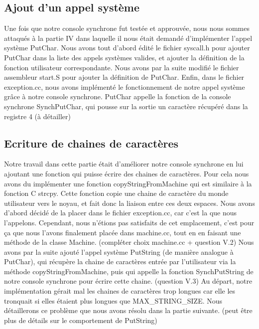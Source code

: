 \documentclass[12pt]{article}
\begin{document}
\subsection{Ajout d'un appel système}
Une fois que notre console synchrone fut testée et approuvée, nous nous sommes attaqués à la partie IV dans laquelle il nous était demandé d'implémenter l'appel système \textcolor{blue2}{PutChar}.
Nous avons tout d'abord édité le fichier \textcolor{vert2}{syscall.h} pour ajouter \textcolor{blue2}{PutChar} dans la liste des appels systèmes valides, et ajouter la définition de la fonction utilisateur correspondante.
Nous avons par la suite modifié le fichier assembleur \textcolor{vert2}{start.S} pour ajouter la définition de \textcolor{blue2}{PutChar}.
Enfin, dans le fichier \textcolor{vert2}{exception.cc}, nous avons implémenté le fonctionnement de notre appel système grâce à notre console synchrone. \textcolor{blue2}{PutChar} appelle la fonction de la console synchrone \textcolor{red2}{SynchPutChar}, qui pousse sur la sortie un caractère récupéré dans la registre 4 (à détailler)

\bigbreak
\subsection{Ecriture de chaines de caractères}
Notre travail dans cette partie était d'améliorer notre console synchrone en lui ajoutant une fonction qui puisse écrire des chaines de caractères. Pour cela nous avons du implémenter une fonction \textcolor{red2}{copyStringFromMachine} qui est similaire à la fonction C \textcolor{red2}{strcpy}. Cette fonction copie une chaine de caractère du monde utilisateur vers le noyau, et fait donc la liaison entre ces deux espaces.
\newline
Nous avons d'abord décidé de la placer dans le fichier \textcolor{vert2}{exception.cc}, car c'est la que nous l'appelons. Cependant, nous n'étions pas satisfaits de cet emplacement, c'est pour ça que nous l'avons finalement placée dans \textcolor{vert2}{machine.cc}, tout en en faisant une méthode de la classe Machine. (compléter choix machine.cc + question V.2)
\newline
Nous avons par la suite ajouté l'appel système \textcolor{blue2}{PutString} (de manière analogue à \textcolor{blue2}{PutChar}), qui récupère la chaine de caractères entrée par l'utilisateur via la méthode \textcolor{red2}{copyStringFromMachine}, puis qui appelle la fonction \textcolor{red2}{SynchPutString} de notre console synchrone pour écrire cette chaine. (question V.3)
Au départ, notre implémentation gérait mal les chaines de caractères trop longues car elle les tronquait si elles étaient plus longues que MAX\_STRING\_SIZE. Nous détaillerons ce problème que nous avons résolu dans la partie suivante. (peut être plus de détails sur le comportement de PutString)
\end{document}
